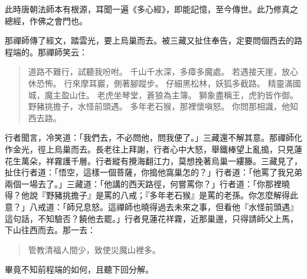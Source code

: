 此時唐朝法師本有根源，耳聞一遍《多心經》，即能記憶，至今傳世。此乃修真之總經，作佛之會門也。

那禪師傳了經文，踏雲光，要上烏巢而去。被三藏又扯住奉告，定要問個西去的路程端的。那禪師笑云：
\begin{quote}
道路不難行，試聽我吩咐。
千山千水深，多瘴多魔處。
若遇接天崖，放心休恐怖。
行來摩耳巖，側著腳蹤步。
仔細黑松林，妖狐多截路。
精靈滿國城，魔主盈山住。
老虎坐琴堂，蒼狼為主簿。
獅象盡稱王，虎豹皆作御。
野豬挑擔子，水怪前頭遇。
多年老石猴，那裡懷嗔怒。
你問那相識，他知西去路。
\end{quote}

行者聞言，冷笑道：「我們去，不必問他，問我便了。」三藏還不解其意。那禪師化作金光，徑上烏巢而去。長老往上拜謝，行者心中大怒，舉鐵棒望上亂搗，只見蓮花生萬朵，祥霧護千層。行者縱有攪海翻江力，莫想挽著烏巢一縷籐。三藏見了，扯住行者道：「悟空，這樣一個菩薩，你搗他窩巢怎的？」行者道：「他罵了我兄弟兩個一場去了。」三藏道：「他講的西天路徑，何嘗罵你？」行者道：「你那裡曉得？他說『野豬挑擔子』是罵的八戒；『多年老石猴』是罵的老孫。你怎麼解得此意？」八戒道：「師兄息怒。這禪師也曉得過去未來之事，但看他『水怪前頭遇』這句話，不知驗否？饒他去罷。」行者見蓮花祥霧，近那巢邊，只得請師父上馬，下山往西而去。那一去：
\begin{quote}
管教清福人間少，致使災魔山裡多。
\end{quote}

畢竟不知前程端的如何，且聽下回分解。
